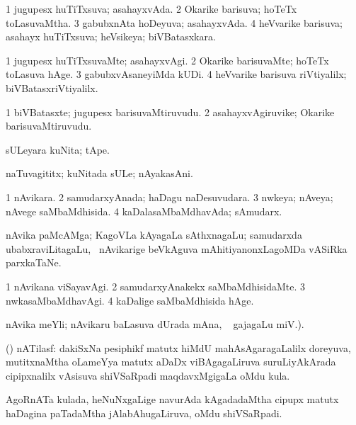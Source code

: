 \bentry
{}
\gl{\gu}
\bmng
\bnum
\num{1} jugupesx huTiTxsuva; asahayxvAda. 
\num{2} Okarike barisuva; hoTeTx toLasuvaMtha. 
\num{3} gabubxnAta hoDeyuva; asahayxvAda. 
\num{4} heVvarike barisuva; asahayx huTiTxsuva; heVsikeya; biVBatasxkara. 
\enum
\emng
\eentry

\bentry
{}
\gl{\kirxvi}
\bmng
\bnum
\num{1} jugupesx huTiTxsuvaMte; asahayxvAgi. 
\num{2} Okarike barisuvaMte; hoTeTx toLasuva hAge. 
\num{3} gabubxvAsaneyiMda kUDi. 
\num{4} heVvarike barisuva riVtiyalilx; biVBatasxriVtiyalilx. 
\enum
\emng
\eentry

\bentry
{}
\gl{\nA}
\bmng
\bnum
\num{1} biVBatasxte; jugupesx barisuvaMtiruvudu. 
\num{2} asahayxvAgiruvike; Okarike barisuvaMtiruvudu. 
\enum
\emng
\eentry

\bentry
{}
\gl{\nA}
\bmng
sULeyara kuNita; tApe. 
\emng
\eentry

\bentry
{}
\gl{\nA}
\bmng
naTuvagititx; kuNitada sULe; nAyakasAni. 
\emng
\eentry

\bentry
{}
\gl{\gu}
\bmng
\bnum
\num{1} nAvikara. 
\num{2} samudarxyAnada; haDagu naDesuvudara. 
\num{3} nwkeya; nAveya; nAvege saMbaMdhisida. 
\num{4} kaDalasaMbaMdhavAda; sAmudarx. 
\enum
\emng
\eentry

\bentry
{}
\gl{\nA}
\bmng
nAvika paMcAMga; KagoVLa kAyagaLa sAthxnagaLu; samudarxda ubabxraviLitagaLu, \mo\ nAvikarige beVkAguva mAhitiyanonxLagoMDa vASiRka parxkaTaNe. 
\emng
\eentry

\bentry
{}
\gl{\kirxvi}
\bmng
\bnum
\num{1} nAvikana viSayavAgi. 
\num{2} samudarxyAnakekx saMbaMdhisidaMte. 
\num{3} nwkasaMbaMdhavAgi. 
\num{4} kaDalige saMbaMdhisida hAge. 
\enum
\emng
\eentry

\bentry
{}
\gl{\nA}
\bmng
nAvika meYli; nAvikaru baLasuva dUrada mAna, \su\  gajagaLu  miV.). 
\emng
\eentry

\bentry
{}
\gl{\nA}
\bmng
(\pArxvi) nATilasf: 
\hypertarget{nautilus(a)}{} 
\banum
{} dakiSxNa pesiphikf matutx hiMdU mahAsAgaragaLalilx doreyuva, mutitxnaMtha oLameYya matutx aDaDx viBAgagaLiruva suruLiyAkArada cipipxnalilx vAsisuva shiVSaRpadi maqdavxMgigaLa oMdu kula.  
\hypertarget{nautilus(b)}{} 
 AgoRnATa kulada, heNuNxgaLige navurAda kAgadadaMtha cipupx matutx haDagina paTadaMtha jAlabAhugaLiruva, oMdu shiVSaRpadi. 
\eanum
\emng

